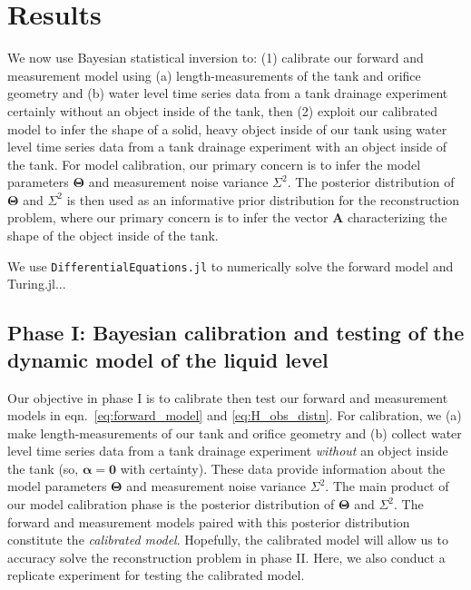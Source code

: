 \documentclass[openacc]{rsproca_new}%
\begin{document}
\section{Results}
We now use Bayesian statistical inversion to:
(1) calibrate our forward and measurement model using (a) length-measurements of the tank and orifice geometry and (b) water level time series data from a tank drainage experiment certainly without an object inside of the tank, then
(2) exploit our calibrated model to infer the shape of a solid, heavy object inside of our tank using water level time series data from a tank drainage experiment with an object inside of the tank.
For model calibration, our primary concern is to infer the model parameters $\boldsymbol \Theta$ and measurement noise variance $\Sigma^2$. The posterior distribution of $\boldsymbol \Theta$ and $\Sigma^2$ is then used as an informative prior distribution for the reconstruction problem, where our primary concern is to infer the vector $\mathbf{A}$ characterizing the shape of the object inside of the tank.

We use \texttt{DifferentialEquations.jl} \cite{rackauckas2017differentialequations} to numerically solve the forward model and Turing.jl...

\subsection{Phase I: Bayesian calibration and testing of the dynamic model of the liquid level}
\label{sec:phaseI}
Our objective in phase I is to calibrate then test our forward and measurement models in eqn.~\ref{eq:forward_model} and \ref{eq:H_obs_distn}.
For calibration, we (a) make length-measurements of our tank and orifice geometry and (b) collect water level time series data from a tank drainage experiment \emph{without} an object inside the tank (so, $\boldsymbol \alpha = \mathbf{0}$ with certainty).
These data provide information about the model parameters $\boldsymbol \Theta$ and measurement noise variance $\Sigma^2$. 
The main product of our model calibration phase is the posterior distribution of $\boldsymbol \Theta$ and $\Sigma^2$.
The forward and measurement models paired with this posterior distribution constitute the \emph{calibrated model}. 
Hopefully, the calibrated model will allow us to accuracy solve the reconstruction problem in phase II. 
Here, we also conduct a replicate experiment for testing the calibrated model. 
\end{document}
